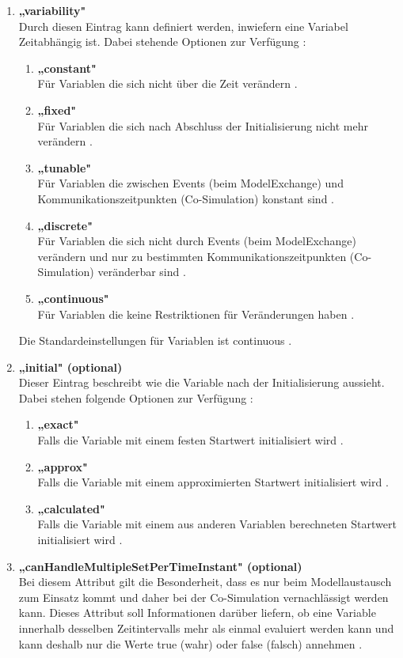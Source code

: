 \begin{enumerate}
	\item \textbf{„variability"} \cite[S.48]{25} \\
	Durch diesen Eintrag kann definiert werden, inwiefern eine Variabel Zeitabhängig ist. Dabei
	stehende Optionen zur Verfügung \cite[S.48]{25}:
		\begin{enumerate}
		\item \textbf{„constant"} \cite[S.48]{25} \\
		Für Variablen die sich nicht über die Zeit verändern \cite[S.48]{25}.
		\item \textbf{„fixed"} \cite[S.48]{25} \\
		Für Variablen die sich nach Abschluss der Initialisierung nicht mehr verändern
		\cite[S.48]{25}.
		\item \textbf{„tunable"} \cite[S.48]{25} \\
		Für Variablen die zwischen Events (beim ModelExchange) und
		Kommunikationszeitpunkten (Co-Simulation) konstant sind \cite[S.48]{25}.
		\item \textbf{„discrete"} \cite[S.48]{25} \\
		Für Variablen die sich nicht durch Events (beim ModelExchange)
		verändern und nur zu bestimmten Kommunikationszeitpunkten (Co-Simulation) veränderbar
		sind \cite[S.48]{25}.
		\item \textbf{„continuous"} \cite[S.48]{25} \\
		Für Variablen die keine Restriktionen für Veränderungen haben \cite[S.48]{25}.
		\end{enumerate}
	Die Standardeinstellungen für Variablen ist continuous \cite[S.48]{25}.
	\item \textbf{„initial" (optional)} \cite[S.48f]{25} \\
	Dieser Eintrag beschreibt wie die Variable nach der Initialisierung aussieht. Dabei stehen
	folgende Optionen zur Verfügung \cite[S.48f]{25}:
	\begin{enumerate}
		\item \textbf{„exact"} \cite[S.48f]{25} \\
		Falls die Variable mit einem festen Startwert initialisiert wird \cite[S.48f]{25}.
		\item \textbf{„approx"} \cite[S.48f]{25} \\
		Falls die Variable mit einem approximierten Startwert initialisiert wird
		\cite[S.48f]{25}.
		\item \textbf{„calculated"} \cite[S.48f]{25} \\
		Falls die Variable mit einem aus anderen Variablen berechneten
		Startwert initialisiert wird \cite[S.48f]{25}.
		\end{enumerate}
	\item \textbf{„canHandleMultipleSetPerTimeInstant" (optional)} \cite[S.49]{25} \\
	Bei diesem Attribut gilt die Besonderheit, dass es nur beim Modellaustausch zum Einsatz
	kommt und daher bei der Co-Simulation vernachlässigt werden kann. Dieses Attribut soll 
	Informationen darüber liefern, ob eine Variable innerhalb desselben Zeitintervalls mehr als 
	einmal evaluiert werden kann und kann deshalb nur die Werte true (wahr) oder false (falsch) 
	annehmen \cite[S.49]{25}.
\end{enumerate}
